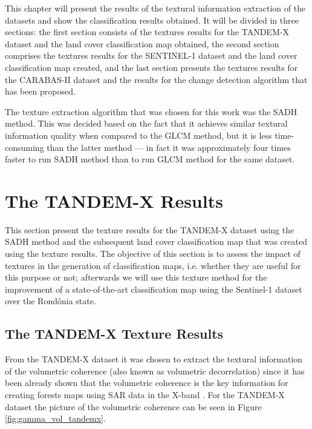 This chapter will present the results of the textural information extraction of the datasets and show the classification results obtained. It will be divided in three sections: the first section consists of the textures results for the TANDEM-X dataset and the land cover classification map obtained, the second section comprises the textures results for the SENTINEL-1 dataset and the land cover classification map created, and the last section presents the textures results for the CARABAS-II dataset and the results for the change detection algorithm that has been proposed.  

The texture extraction algorithm that was chosen for this work was the SADH method. This was decided based on the fact that it achieves similar textural information quality when compared to the GLCM method, but it is less time-consuming than the latter method --- in fact it was approximately four times faster to run SADH method than to run GLCM method for the same dataset.

\section{The TANDEM-X Results}
This section present the texture results for the TANDEM-X dataset using the SADH method and the subsequent land cover classification map that was created using the texture results. The objective of this section is to assess the impact of textures in the generation of classification maps, i.e. whether they are useful for this purpose or not; afterwards we will use this texture method for the improvement of a state-of-the-art classification map using the Sentinel-1 dataset over the Rondônia state.

\subsection{The TANDEM-X Texture Results}
From the TANDEM-X dataset it was chosen to extract the textural information of the volumetric coherence (also known as volumetric decorrelation) since it has been already shown that the volumetric coherence is the key information for creating forests maps using SAR data in the X-band \cite{Paolo,Rizzoli, Alberto}. For the TANDEM-X dataset the picture of the volumetric coherence can be seen in Figure \ref{fig:gamma_vol_tandemx}.

